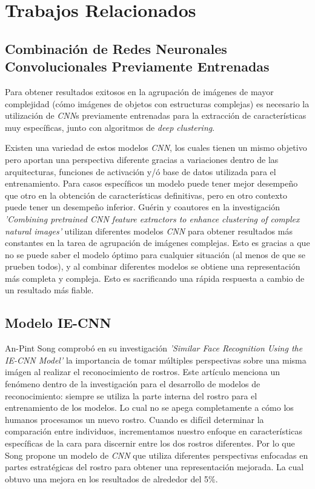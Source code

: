 \documentclass[letterpaper, 10 pt, conference]{ieeeconf}  %
\begin{document}
    \section{Trabajos Relacionados}

    \subsection{Combinación de Redes Neuronales Convolucionales Previamente Entrenadas}
    Para obtener resultados exitosos en la agrupación de imágenes de mayor complejidad
    (cómo imágenes de objetos con estructuras complejas) es necesario la utilización
    de \textit{CNN}s previamente entrenadas para la extracción de características muy específicas,
    junto con algoritmos de \textit{deep clustering}. \cite{DCCS}\cite{JULE}\cite{Agarap2020}
    
    Existen una variedad de estos modelos \textit{CNN}, los cuales tienen un mismo objetivo pero
    aportan una perspectiva diferente gracias a variaciones dentro de las arquitecturas, funciones
    de activación y/ó base de datos utilizada para el entrenamiento. Para casos específicos un
    modelo puede tener mejor desempeño que otro en la obtención de características definitivas,
    pero en otro contexto puede tener un desempeño inferior. Guérin y coautores en la investigación
    \textit{'Combining pretrained CNN feature extractors to enhance clustering of complex natural images'}
    utilizan diferentes modelos \textit{CNN} para obtener resultados más constantes en la tarea de
    agrupación de imágenes complejas. Esto es gracias a que no se puede saber el modelo óptimo para
    cualquier situación (al menos de que se prueben todos), y al combinar diferentes modelos se
    obtiene una representación más completa y compleja. Esto es sacrificando una rápida respuesta
    a cambio de un resultado más fiable.\cite{CombiningCNN}


    \subsection{Modelo IE-CNN}
    An-Pint Song comprobó en su investigación \textit{'Similar Face Recognition Using the IE-CNN
    Model'} la importancia de tomar múltiples perspectivas sobre una misma imágen al realizar el
    reconocimiento de rostros.\cite{IECNN} Este artículo menciona un fenómeno dentro de la
    investigación para el desarrollo de modelos de reconocimiento: siempre se utiliza la parte
    interna del rostro para el entrenamiento de los modelos. Lo cual no se apega completamente
    a cómo los humanos procesamos un nuevo rostro. Cuando es difícil determinar la comparación
    entre individuos, incrementamos nuestro enfoque en características específicas de la cara
    para discernir entre los dos rostros diferentes.\cite{Young1987}\cite{Andrews2010}
    Por lo que Song propone un modelo de \textit{CNN} que utiliza diferentes perspectivas
    enfocadas en partes estratégicas del rostro para obtener una representación mejorada.
    La cual obtuvo una mejora en los resultados de alrededor del 5\%.\cite{IECNN}
\end{document}
